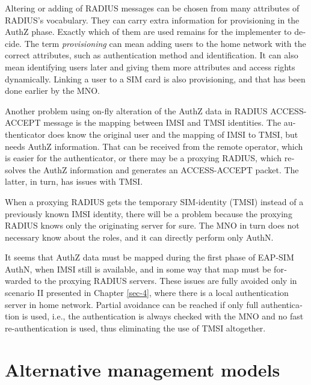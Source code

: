 \documentclass[12pt,a4paper,english]{tutthesis}
\begin{document}
\begin{otherlanguage}{english}
Altering or adding of  RADIUS messages can be chosen from many
attributes of RADIUS's vocabulary. They can carry extra information
for provisioning in the AuthZ phase. Exactly which of them are used
remains for the implementer to decide.
The term \emph{provisioning} can mean adding users to the home network with
the correct
attributes, such as authentication method and identification.
It can also mean identifying users later and giving
them more attributes and access rights dynamically.
Linking a user to a SIM card is also provisioning, and that has
been done earlier by the MNO.













Another problem using on-fly alteration of the AuthZ data in RADIUS ACCESS-ACCEPT message
is the mapping between IMSI and TMSI identities.
The authenticator does know the original user and the mapping of IMSI to
TMSI, but needs AuthZ information. That can be received from the
remote operator, which is easier for the
authenticator, or there may be a proxying RADIUS, which resolves the
AuthZ information and generates an ACCESS-ACCEPT packet. The latter,
in turn, has issues with TMSI.

When a proxying RADIUS gets the temporary SIM-identity (TMSI) instead
of a previously known IMSI identity, there will be a problem
because the proxying RADIUS knows  only the originating
server for sure.  The MNO in turn does not necessary know about the roles, and
it can directly perform only AuthN.

It seems that AuthZ data must be mapped during the first phase of
EAP-SIM AuthN, when IMSI still is available, and in some way
that map must be forwarded to the proxying RADIUS servers.
These issues are fully avoided only in scenario II presented in Chapter
\ref{sec-4}, where there is a local authentication server in home network.
Partial avoidance can be reached if only full authentication is
used, i.e., the authentication is always checked with the MNO and no
fast re-authentication is used, thus eliminating the use of TMSI altogether.


\section{Alternative management models}
\label{sec-6-6}


\end{otherlanguage}
\end{document}
